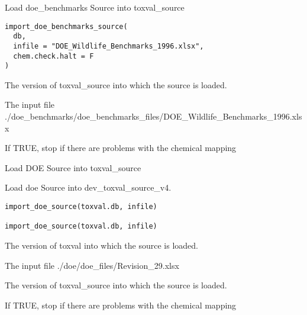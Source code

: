 \documentclass[letterpaper]{book}
\begin{document}
%
\begin{Description}\relax
Load doe\_benchmarks Source into toxval\_source
\end{Description}
%
\begin{Usage}
\begin{verbatim}
import_doe_benchmarks_source(
  db,
  infile = "DOE_Wildlife_Benchmarks_1996.xlsx",
  chem.check.halt = F
)
\end{verbatim}
\end{Usage}
%
\begin{Arguments}
\begin{ldescription}
\item[\code{db}] The version of toxval\_source into which the source is loaded.

\item[\code{infile}] The input file ./doe\_benchmarks/doe\_benchmarks\_files/DOE\_Wildlife\_Benchmarks\_1996.xlsx

\item[\code{chem.check.halt}] If TRUE, stop if there are problems with the chemical mapping
\end{ldescription}
\end{Arguments}
%
\begin{Description}\relax
Load DOE Source into toxval\_source

Load doe Source into dev\_toxval\_source\_v4.
\end{Description}
%
\begin{Usage}
\begin{verbatim}
import_doe_source(toxval.db, infile)

import_doe_source(toxval.db, infile)
\end{verbatim}
\end{Usage}
%
\begin{Arguments}
\begin{ldescription}
\item[\code{toxval.db}] The version of toxval into which the source is loaded.

\item[\code{infile}] The input file ./doe/doe\_files/Revision\_29.xlsx

\item[\code{db}] The version of toxval\_source into which the source is loaded.

\item[\code{chem.check.halt}] If TRUE, stop if there are problems with the chemical mapping
\end{ldescription}
\end{Arguments}
\end{document}
